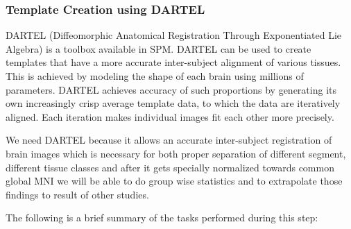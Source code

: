 \documentclass[12pt]{article}
\begin{document}
\subsubsection{Template Creation using DARTEL}

DARTEL (Diffeomorphic Anatomical Registration Through Exponentiated
Lie Algebra) is a toolbox available in SPM. DARTEL can be used to
create templates that have a more accurate inter-subject alignment of
various tissues. This is achieved by modeling the shape of each brain
using millions of parameters. DARTEL achieves accuracy of such
proportions by generating its own increasingly crisp average template
data, to which the data are iteratively aligned. Each iteration makes
individual images fit each other more precisely.

We need DARTEL because it allows an accurate inter-subject
registration of brain images which is necessary for both proper
separation of different segment, different tissue classes and after
it gets specially normalized towards common global MNI we will be able
to do group wise statistics and to extrapolate those findings to
result of other studies.

The following is a brief summary of the tasks performed during this
step:

\end{document}
